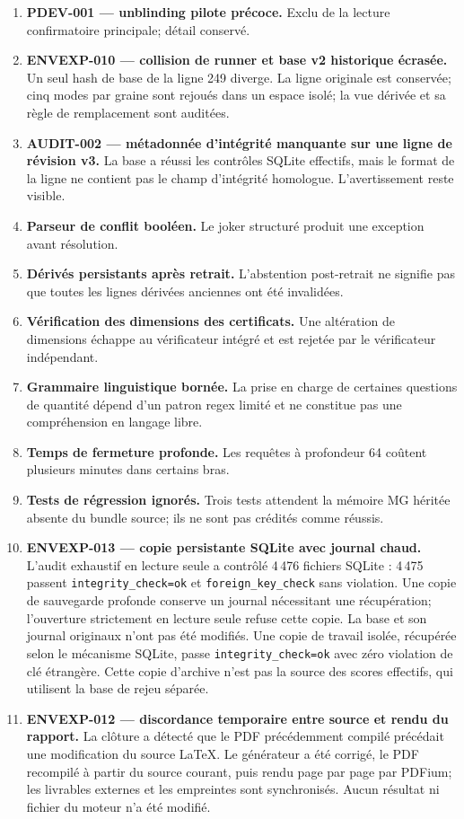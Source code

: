 \documentclass[11pt,a4paper]{article}
\begin{document}
\begin{enumerate}[leftmargin=*]
\item \textbf{PDEV-001 — unblinding pilote précoce.} Exclu de la lecture confirmatoire principale; détail conservé.
\item \textbf{ENVEXP-010 — collision de runner et base v2 historique écrasée.} Un seul hash de base de la ligne 249 diverge. La ligne originale est conservée; cinq modes par graine sont rejoués dans un espace isolé; la vue dérivée et sa règle de remplacement sont auditées.
\item \textbf{AUDIT-002 — métadonnée d’intégrité manquante sur une ligne de révision v3.} La base a réussi les contrôles SQLite effectifs, mais le format de la ligne ne contient pas le champ d’intégrité homologue. L’avertissement reste visible.
\item \textbf{Parseur de conflit booléen.} Le joker structuré produit une exception avant résolution.
\item \textbf{Dérivés persistants après retrait.} L’abstention post-retrait ne signifie pas que toutes les lignes dérivées anciennes ont été invalidées.
\item \textbf{Vérification des dimensions des certificats.} Une altération de dimensions échappe au vérificateur intégré et est rejetée par le vérificateur indépendant.
\item \textbf{Grammaire linguistique bornée.} La prise en charge de certaines questions de quantité dépend d’un patron regex limité et ne constitue pas une compréhension en langage libre.
\item \textbf{Temps de fermeture profonde.} Les requêtes à profondeur 64 coûtent plusieurs minutes dans certains bras.
\item \textbf{Tests de régression ignorés.} Trois tests attendent la mémoire MG héritée absente du bundle source; ils ne sont pas crédités comme réussis.
\item \textbf{ENVEXP-013 — copie persistante SQLite avec journal chaud.} L’audit exhaustif en lecture seule a contrôlé 4\,476 fichiers SQLite : 4\,475 passent \texttt{integrity\_check=ok} et \texttt{foreign\_key\_check} sans violation. Une copie de sauvegarde profonde conserve un journal nécessitant une récupération; l’ouverture strictement en lecture seule refuse cette copie. La base et son journal originaux n’ont pas été modifiés. Une copie de travail isolée, récupérée selon le mécanisme SQLite, passe \texttt{integrity\_check=ok} avec zéro violation de clé étrangère. Cette copie d’archive n’est pas la source des scores effectifs, qui utilisent la base de rejeu séparée.
\item \textbf{ENVEXP-012 — discordance temporaire entre source et rendu du rapport.} La clôture a détecté que le PDF précédemment compilé précédait une modification du source LaTeX. Le générateur a été corrigé, le PDF recompilé à partir du source courant, puis rendu page par page par PDFium; les livrables externes et les empreintes sont synchronisés. Aucun résultat ni fichier du moteur n’a été modifié.
\end{enumerate}
\end{document}

